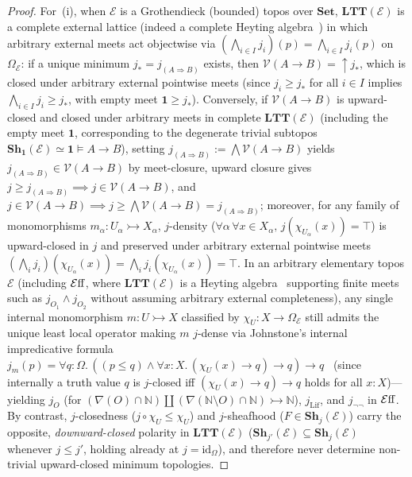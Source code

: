 \begin{proof}
For~(i), when $\mathcal{E}$ is a Grothendieck (bounded) topos over $\mathbf{Set}$, $\mathbf{LTT}(\mathcal{E})$ is a complete external lattice (indeed a complete Heyting algebra~\cite[\S A4.5]{Johnstone02}) in which arbitrary external meets act objectwise via $(\bigwedge_{i \in I} j_i)(p) = \bigwedge_{i \in I} j_i(p)$ on $\Omega_{\mathcal{E}}$: if a unique minimum $j_* = j_{(A \Rightarrow B)}$ exists, then $\mathcal{V}(A \to B) = {\uparrow} j_*$, which is closed under arbitrary external pointwise meets (since $j_i \ge j_*$ for all $i \in I$ implies $\bigwedge_{i \in I} j_i \ge j_*$, with empty meet $\mathbf{1} \ge j_*$). Conversely, if $\mathcal{V}(A \to B)$ is upward-closed and closed under arbitrary meets in complete $\mathbf{LTT}(\mathcal{E})$ (including the empty meet $\mathbf{1}$, corresponding to the degenerate trivial subtopos $\mathbf{Sh}_{\mathbf{1}}(\mathcal{E}) \simeq \mathbf{1} \models A \to B$), setting $j_{(A \Rightarrow B)} := \bigwedge \mathcal{V}(A \to B)$ yields $j_{(A \Rightarrow B)} \in \mathcal{V}(A \to B)$ by meet-closure, upward closure gives $j \ge j_{(A \Rightarrow B)} \implies j \in \mathcal{V}(A \to B)$, and $j \in \mathcal{V}(A \to B) \implies j \ge \bigwedge \mathcal{V}(A \to B) = j_{(A \Rightarrow B)}$; moreover, for any family of monomorphisms $m_\alpha : U_\alpha \rightarrowtail X_\alpha$, $j$-density ($\forall \alpha\,\forall x \in X_\alpha,\, j(\chi_{U_\alpha}(x)) = \top$) is upward-closed in $j$ and preserved under arbitrary external pointwise meets $(\bigwedge_i j_i)(\chi_{U_\alpha}(x)) = \bigwedge_i j_i(\chi_{U_\alpha}(x)) = \top$. In an arbitrary elementary topos $\mathcal{E}$ (including $\mathcal{E}\mathrm{ff}$, where $\mathbf{LTT}(\mathcal{E})$ is a Heyting algebra~\cite[\S A4.5]{Johnstone02} supporting finite meets such as $j_{O_1} \wedge j_{O_2}$ without assuming arbitrary external completeness), any single internal monomorphism $m : U \rightarrowtail X$ classified by $\chi_U : X \to \Omega_{\mathcal{E}}$ still admits the unique least local operator making $m$ $j$-dense via Johnstone's internal impredicative formula $j_m(p) = \forall q : \Omega.\, ((p \le q) \wedge \forall x : X.\, (\chi_U(x) \to q) \to q) \to q$~\cite[A4.5]{Johnstone02} (since internally a truth value $q$ is $j$-closed iff $(\chi_U(x) \to q) \to q$ holds for all $x : X$)---yielding $j_O$ (for $(\nabla(O)\cap\mathbb{N}) \amalg (\nabla(\mathbb{N}\setminus O)\cap\mathbb{N}) \rightarrowtail \mathbb{N}$), $j_{\mathrm{Lif}}$, and $j_{\neg\neg}$ in $\mathcal{E}\mathrm{ff}$. By contrast, $j$-closedness ($j \circ \chi_U \le \chi_U$) and $j$-sheafhood ($F \in \mathbf{Sh}_j(\mathcal{E})$) carry the opposite, \emph{downward-closed} polarity in $\mathbf{LTT}(\mathcal{E})$ ($\mathbf{Sh}_{j'}(\mathcal{E}) \subseteq \mathbf{Sh}_j(\mathcal{E})$ whenever $j \le j'$, holding already at $j = \mathrm{id}_\Omega$), and therefore never determine non-trivial upward-closed minimum topologies.


\end{proof}
